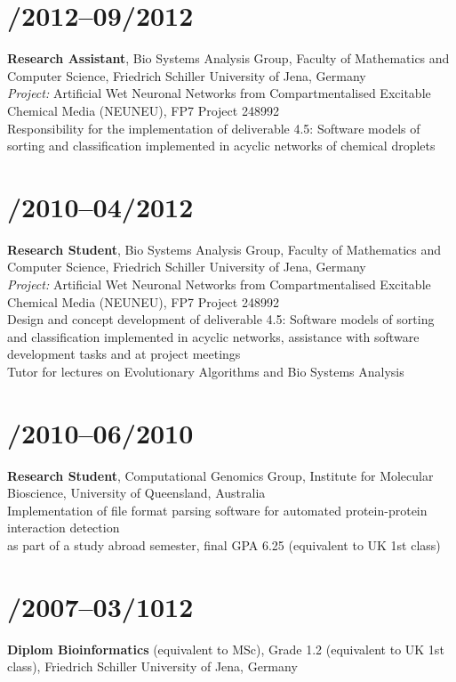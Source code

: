 \documentclass[margin,line,10pt]{res}
\begin{document}
\begin{resume}
\section{/2012--09/2012}{\bf Research Assistant}, Bio Systems Analysis Group, Faculty of Mathematics and Computer Science, Friedrich Schiller University of Jena, Germany\\
{\em Project:} Artificial Wet Neuronal Networks from Compartmentalised Excitable Chemical Media (NEUNEU), FP7 Project 248992\\
Responsibility for the implementation of deliverable 4.5: Software models of sorting and classification implemented in acyclic networks of chemical droplets\\
\vspace*{-.35in}
\section{/2010--04/2012}{\bf Research Student}, Bio Systems Analysis Group, Faculty of Mathematics and Computer Science, Friedrich Schiller University of Jena, Germany\\
{\em Project:} Artificial Wet Neuronal Networks from Compartmentalised Excitable Chemical Media (NEUNEU), FP7 Project 248992\\
Design and concept development of deliverable 4.5: Software models of sorting and classification implemented in acyclic networks, assistance with software development tasks and at project meetings\\
Tutor for lectures on Evolutionary Algorithms and Bio Systems Analysis\\
\vspace*{-.35in}
\section{/2010--06/2010}{\bf Research Student}, Computational Genomics Group, Institute for Molecular Bioscience, University of Queensland, Australia\\
Implementation of file format parsing software for automated protein-protein interaction detection\\
as part of a study abroad semester, final GPA 6.25 (equivalent to UK 1st class)\\
\vspace*{-.35in}
\section{/2007--03/1012}{\bf Diplom Bioinformatics} (equivalent to MSc), Grade 1.2 (equivalent to UK 1st class), Friedrich Schiller University of Jena, Germany\\ 


\end{resume}
\end{document}
